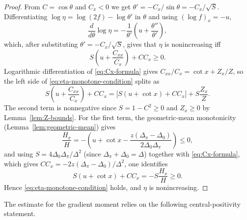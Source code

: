 \documentclass{amsart}
\begin{document}
\begin{proof}
From $C=\cos\theta$ and $C_x<0$ we get
$\theta'=-C_x/\sin\theta=-C_x/\sqrt S$. Differentiating
$\log\eta=\log(2f)-\log\theta'$ in $\theta$ and using $(\log f)_x=-u$,
\[
\frac{d}{d\theta}\log\eta=-\frac{1}{\theta'}\left(u+\frac{\theta''}{\theta'}\right),
\]
which, after substituting $\theta'=-C_x/\sqrt S$, gives that $\eta$ is
nonincreasing iff
\begin{equation}\label{eq:eta-monotone-condition}
S\left(u+\frac{C_{xx}}{C_x}\right)+CC_x\geq0.
\end{equation}
Logarithmic differentiation of \eqref{eq:Cx-formula} gives
$C_{xx}/C_x=\cot x+Z_x/Z$, so the left side of
\eqref{eq:eta-monotone-condition} splits as
\begin{equation}\label{eq:eta-split}
S\left(u+\frac{C_{xx}}{C_x}\right)+CC_x
=\bigl[S(u+\cot x)+CC_x\bigr]+S\frac{Z_x}{Z}.
\end{equation}
The second term is nonnegative since $S=1-C^2\geq 0$ and $Z_x\geq 0$ by
Lemma~\ref{lem:Z-bounds}. For the first term, the geometric-mean
monotonicity (Lemma~\ref{lem:geometric-mean}) gives
\[
\frac{H_x}{H}
=-\left(u+\cot x-\frac{z(\Delta_\pi-\Delta_0)}{2\Delta_0\Delta_\pi}\right)\leq 0,
\]
and using $S=4\Delta_0\Delta_\pi/\Delta^2$ (since $\Delta_\pi+\Delta_0=\Delta$) together with
\eqref{eq:Cx-formula}, which gives $CC_x=-2z(\Delta_\pi-\Delta_0)/\Delta^2$, one
identifies
\[
S(u+\cot x)+CC_x=-S\frac{H_x}{H}\geq 0.
\]
Hence \eqref{eq:eta-monotone-condition} holds, and $\eta$ is
nonincreasing.
\end{proof}

The estimate for the gradient moment relies on the following central-positivity statement.
\end{document}
